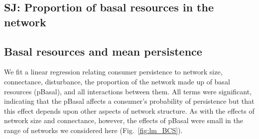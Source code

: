 \documentclass[12pt]{article}
\begin{document}
\begin{spacing}{2.0}
    
    \clearpage
    
\clearpage 

\section*{SJ: Proportion of basal resources in the network}

    \subsection*{Basal resources and mean persistence}

        We fit a linear regression relating consumer persistence to network size, connectance, disturbance, the proportion of the network made up of basal resources (pBasal), and all interactions between them. All terms were significant, indicating that the pBasal affects a consumer's probability of persistence but that this effect depends upon other aspects of network structure.
        As with the effects of network size and connectance, however, the effects of pBasal were small in the range of networks we considered here (Fig.~\ref{fig:lm_BCS}).
    

\end{spacing}
\end{document}
